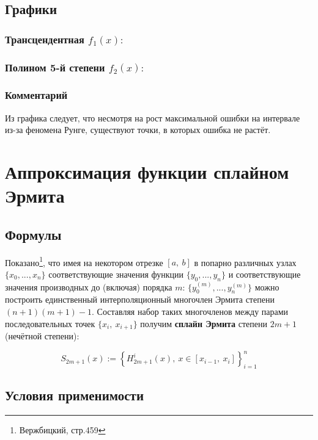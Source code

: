 \subsection{Графики}

\subsubsection{Трансцендентная $f_1(x):$}


\clearpage

\subsubsection{Полином 5-й степени $f_2(x):$}


\subsubsection*{Комментарий}
Из графика следует, что несмотря на рост максимальной ошибки на интервале из-за феномена Рунге, существуют точки, в которых ошибка не растёт.

\clearpage

\section{Аппроксимация функции сплайном Эрмита}

\subsection{Формулы}

Показано\footnote{Вержбицкий, стр.459}, что имея на некотором отрезке $[a,~b]$ в попарно различных узлах $\{x_0,...,x_n\}$ соответствующие значения функции $\{y_0,...,y_n\}$ и соответствующие значения производных до (включая) порядка $m$: $\{y^{(m)}_0,...,y^{(m)}_n\}$ можно построить единственный интерполяционный многочлен Эрмита степени $(n+1)(m+1)-1$. Составляя набор таких многочленов между парами последовательных точек $\{x_i,~x_{i+1}\}$ получим \textbf{сплайн Эрмита} степени $2m+1$ (нечётной степени):

\begin{equation}
    S_{2m+1}(x):=\left\lbrace H^i_{2m+1} (x), ~ x \in [x_{i-1},~ x_i] \right\rbrace^n_{i=1}
\end{equation}

\subsection{Условия применимости}

